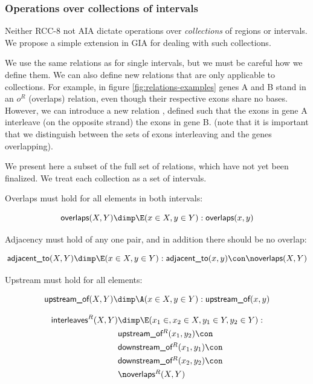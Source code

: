 \documentclass{article}
\def\upstreamOf{\pr{upstream\_of}}
\def\upstreamOfRC{\pr{upstream\_of$^{R}$}}
\def\downstreamOfRC{\pr{downstream\_of$^{R}$}}
\def\adjacentTo{\pr{adjacent\_to}}
\def\interleaves{\pr{interleaves}}
\def\interleavesR{\pr{interleaves$^{R}$}}
\def\overlaps{\pr{overlaps}}
\def\overlapsRC{\pr{overlaps$^{R}$}}
\begin{document}
\subsubsection{Operations over collections of intervals}

Neither RCC-8 not AIA dictate operations over \emph{collections} of regions
or intervals. We propose a simple extension in GIA for dealing with
such collections.

We use the same relations as for single intervals, but we must be
careful how we define them. We can also define new relations that are
only applicable to collections. For example, in figure
\ref{fig:relations-examples} genes A and B stand in an $o^{R}$
(overlaps) relation, even though their respective exons share no
bases. However, we can introduce a new relation \interleavesR,
defined such that the exons in gene A interleave (on the opposite
strand) the exons in gene B. (note that it is important that we
distinguish between the sets of exons interleaving and the genes
overlapping).

We present here a subset of the full set of relations, which have not
yet been finalized. We treat each collection as a set of intervals.

Overlaps must hold for all elements in both intervals:

$$\overlaps(X,Y) \dimp \E (x \in X,y \in Y) : \overlaps(x,y) $$

Adjacency must hold of any one pair, and in addition there should be no overlap:

$$\adjacentTo(X,Y) \dimp \E (x \in X,y \in Y) : \adjacentTo(x, y) \con \n \overlaps(X,Y)$$

Upstream must hold for all elements:

$$\upstreamOf(X,Y) \dimp \A (x \in X, y \in Y) : \upstreamOf(x,y)$$

\begin{equation*}\begin{split}
\interleaves^{R}(X,Y) & \dimp \E (x_1 \in ,x_2 \in X,y_1 \in Y,y_2 \in Y) : \\
& \upstreamOfRC(x_1,  y_2) \con \\
& \downstreamOfRC(x_1, y_1) \con \\
& \downstreamOfRC( x_2, y_2) \con \\
& \n \overlapsRC(X, Y)\\
\end{split}\end{equation*}
\end{document}
